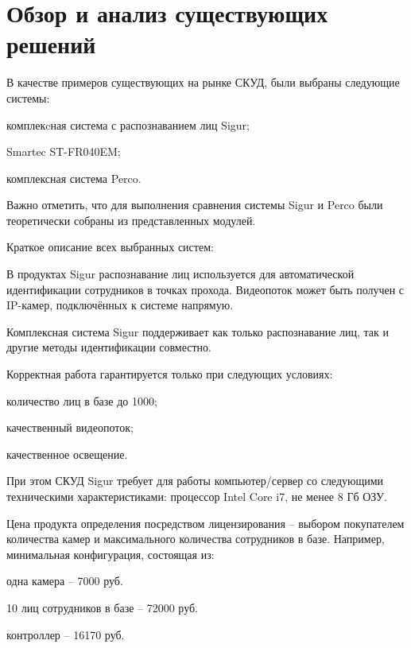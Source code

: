 \section{Обзор и анализ существующих решений}

В качестве примеров существующих на рынке СКУД, были выбраны следующие системы:

\begin{itemize*}
\item комплекcная система с распознаванием лиц Sigur;
\item Smartec ST-FR040EM;
\item комплексная система Perco.
\end{itemize*}

Важно отметить, что для выполнения сравнения системы Sigur и Perco были теоретически собраны из представленных модулей.

Краткое описание всех выбранных систем:

В продуктах Sigur распознавание лиц используется для автоматической идентификации сотрудников в точках прохода. Видеопоток может быть получен с IP-камер, подключённых к системе напрямую.

Комплексная система Sigur поддерживает как только распознавание лиц, так и другие методы идентификации совместно.


Корректная работа гарантируется только при следующих условиях:

\begin{itemize*}
\item количество лиц в базе до 1000;
\item качественный видеопоток;
\item качественное освещение.
\end{itemize*}

При этом СКУД Sigur требует для работы компьютер/сервер со следующими техническими характеристиками: процессор Intel Core i7, не менее 8 Гб ОЗУ.

Цена продукта определения посредством лицензирования -- выбором покупателем количества камер и максимального количества сотрудников в базе. Например, минимальная конфигурация, состоящая из:

\begin{itemize*}
\item одна камера -- 7000 руб.
\item 10 лиц сотрудников в базе -- 72000 руб.
\item контроллер -- 16170 руб.
\end{itemize*}

